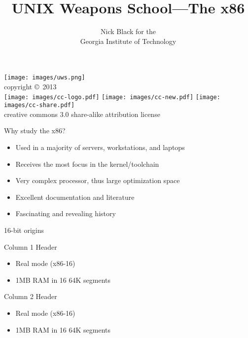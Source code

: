 \documentclass[xcolor={dvipsnames,table}]{beamer}
\title{UNIX Weapons School---The x86}
\date{}
\author{Nick Black for the\\
Georgia Institute of Technology
}
\begin{document}
\begin{frame}
\titlepage
\begin{center}
\texttt{[image: images/uws.png]}\\
\vspace{.1in}
\tiny{copyright \copyright\ 2013}\\
\texttt{[image: images/cc-logo.pdf]}
\texttt{[image: images/cc-new.pdf]}
\texttt{[image: images/cc-share.pdf]}\\
\tiny{creative commons 3.0 share-alike attribution license}
\end{center}
\end{frame}

\begin{frame}{Why study the x86?}
\begin{itemize}
\item Used in a majority of servers, workstations, and laptops
\item Receives the most focus in the kernel/toolchain
\item Very complex processor, thus large optimization space
\item Excellent documentation and literature
\item Fascinating and revealing history
\end{itemize}
\end{frame}

\begin{frame}[t]{16-bit origins}
\begin{block}{Column 1 Header}
\begin{itemize}
\item Real mode (x86-16)
\item 1MB RAM in 16 64K segments
\end{itemize}
\end{block}
\begin{block}{Column 2 Header}
\begin{itemize}
\item Real mode (x86-16)
\item 1MB RAM in 16 64K segments
\end{itemize}
\end{block}
\vfill
\begin{center}
\end{center}
\end{frame}
\end{document}
